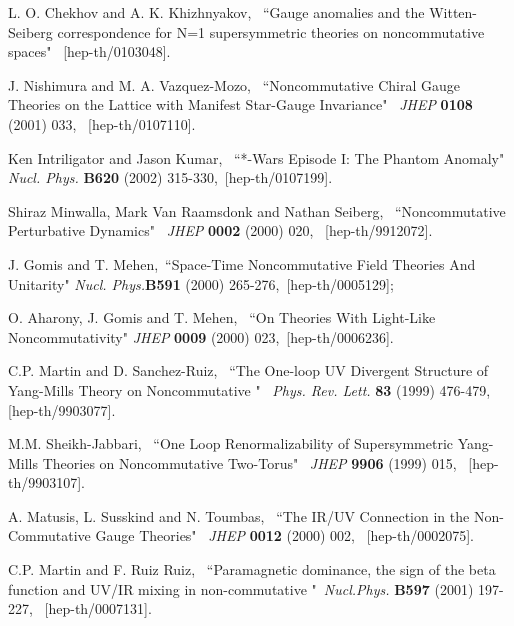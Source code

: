 \documentclass[a4paper,12pt]{article}
\begin{document}
\begin{thebibliography}{References}
L. O. Chekhov and A. K. Khizhnyakov, \, ``Gauge anomalies and the 
Witten-Seiberg correspondence for N=1 supersymmetric theories on 
noncommutative spaces" \, [hep-th/0103048].

J. Nishimura and M. A. Vazquez-Mozo, \, ``Noncommutative Chiral Gauge Theories 
on the Lattice with Manifest Star-Gauge Invariance" \, {\it JHEP} {\bf 0108} 
(2001) 033, \, [hep-th/0107110]. 

Ken Intriligator and Jason Kumar, \, ``*-Wars Episode I: The Phantom Anomaly" 
\, {\it Nucl. Phys.} {\bf B620} (2002) 315-330, \,[hep-th/0107199]. 

Shiraz Minwalla, Mark Van Raamsdonk and Nathan Seiberg,
\, ``Noncommutative Perturbative Dynamics" \, 
{\it JHEP} {\bf 0002} (2000) 020, \, [hep-th/9912072]. 


%
J. Gomis and T. Mehen, \,``Space-Time Noncommutative Field Theories And 
Unitarity" {\it Nucl. Phys.}{\bf B591} (2000) 265-276, \,[hep-th/0005129]; 

O. Aharony, J. Gomis and T. Mehen, \, ``On Theories With Light-Like 
Noncommutativity" {\it JHEP} {\bf 0009} (2000) 023, \,[hep-th/0006236]. 


C.P. Martin and D. Sanchez-Ruiz, 
\, ``The One-loop UV Divergent Structure of \coordHE{} Yang-Mills Theory on 
Noncommutative \coordHE{}" \, {\it Phys. Rev. Lett.} {\bf 83} (1999) 476-479, 
\, [hep-th/9903077]. 

M.M. Sheikh-Jabbari, \, ``One Loop Renormalizability of Supersymmetric 
Yang-Mills Theories on Noncommutative Two-Torus" \, {\it JHEP} {\bf 9906} 
(1999) 015, \, [hep-th/9903107].

A. Matusis, L. Susskind and N. Toumbas, \, ``The IR/UV Connection in the 
Non-Commutative Gauge Theories" \, {\it JHEP} {\bf 0012} (2000) 002, \,
[hep-th/0002075].


C.P. Martin and F. Ruiz Ruiz, \, ``Paramagnetic dominance, the sign of the beta function and UV/IR mixing in non-commutative \coordHE{}"\, 
{\it Nucl.Phys.} {\bf B597} (2001) 197-227, \, [hep-th/0007131].


\end{thebibliography}
\end{document}
